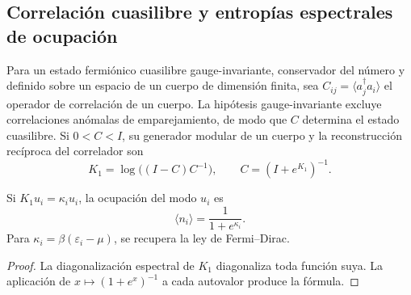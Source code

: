 \subsection{Correlación cuasilibre y entropías espectrales de ocupación}
\label{v:v:rec:cuasilibre:section:01}

Para un estado fermiónico cuasilibre gauge-invariante, conservador del
número y definido sobre un espacio de un cuerpo de dimensión finita, sea
\(C_{ij}=\langle a_j^\dagger a_i\rangle\) el operador de correlación de un
cuerpo. La hipótesis gauge-invariante excluye correlaciones anómalas de
emparejamiento, de modo que \(C\) determina el estado cuasilibre. Si
\(0<C<I\), su generador modular de un cuerpo y la reconstrucción recíproca
del correlador son
\begin{equation}
 \boxed{
 K_1=\log\bigl((I-C)C^{-1}\bigr),
 \qquad
 C=(I+e^{K_1})^{-1}.}
 \label{v:v:rec:eq:puente-cuasilibre-modular-rev3}
\end{equation}

\begin{corollary}
\label{v:v:rec:cor:forma-logistica-modular-rev3}
Si \(K_1u_i=\kappa_i u_i\), la ocupación del modo \(u_i\) es
\[
 \langle n_i\rangle=\frac1{1+e^{\kappa_i}}.
\]
Para \(\kappa_i=\beta(\varepsilon_i-\mu)\), se recupera la ley de
Fermi--Dirac.
\end{corollary}

\begin{proof}
La diagonalización espectral de \(K_1\) diagonaliza toda función suya. La
aplicación de \(x\mapsto(1+e^x)^{-1}\) a cada autovalor produce la fórmula.
\end{proof}

